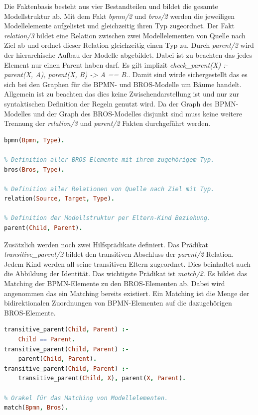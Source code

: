 Die Faktenbasis besteht aus vier Bestandteilen und bildet die gesamte Modellstruktur ab.
Mit dem Fakt \emph{bpmn/2} und \emph{bros/2} werden die jeweiligen Modellelemente aufgelistet und gleichzeitig ihren Typ zugeordnet.
Der Fakt \emph{relation/3} bildet eine Relation zwischen zwei Modellelementen von Quelle nach Ziel ab und ordnet dieser Relation gleichzeitig einen Typ zu.
Durch \emph{parent/2} wird der hierarchische Aufbau der Modelle abgebildet.
Dabei ist zu beachten das jedes Element nur einen Parent haben darf.
Es gilt implizit \emph{check\_parent(X) :- parent(X, A), parent(X, B) -> A == B.}.
Damit sind wirde sichergestellt das es sich bei den Graphen für die BPMN- und BROS-Modelle um Bäume handelt.
Allgemein ist zu beachten das dies keine Zwischendarstellung ist und nur zur syntaktischen Definition der Regeln genutzt wird.
Da der Graph des BPMN-Modelles und der Graph des BROS-Modelles disjunkt sind muss keine weitere Trennung der \emph{relation/3} und \emph{parent/2} Fakten durchgeführt werden.

\begin{lstlisting}[language=Prolog, caption=Definitionen der Faktenbasis, label=lst:definition_facts]
% Definition aller BPMN Elemente mit ihrem zugehörigem Typ.
bpmn(Bpmn, Type).

% Definition aller BROS Elemente mit ihrem zugehörigem Typ.
bros(Bros, Type).

% Definition aller Relationen von Quelle nach Ziel mit Typ.
relation(Source, Target, Type).

% Definition der Modellstruktur per Eltern-Kind Beziehung.
parent(Child, Parent).
\end{lstlisting}

Zusätzlich werden noch zwei Hilfsprädikate definiert.
Das Prädikat \emph{transitive\_parent/2} bildet den transitiven Abschluss der \emph{parent/2} Relation.
Jedem Kind werden all seine transitiven Eltern zugeordnet.
Dies beinhaltet auch die Abbildung der Identität.
Das wichtigste Prädikat ist \emph{match/2}.
Es bildet das Matching der BPMN-Elemente zu den BROS-Elementen ab.
Dabei wird angenommen das ein Matching bereits existiert.
Ein Matching ist die Menge der bidirektionalen Zuordnungen von BPMN-Elementen auf die dazugehörigen BROS-Elemente. 

\begin{lstlisting}[language=Prolog, caption=Definitionen der weiterführenden Regeln, label=lst:definition_predicats]
% Transitiver Abschluss der Modellstruktur.
transitive_parent(Child, Parent) :- 
    Child == Parent.
transitive_parent(Child, Parent) :- 
    parent(Child, Parent).
transitive_parent(Child, Parent) :- 
    transitive_parent(Child, X), parent(X, Parent).

% Orakel für das Matching von Modellelementen.
match(Bpmn, Bros).
\end{lstlisting}

